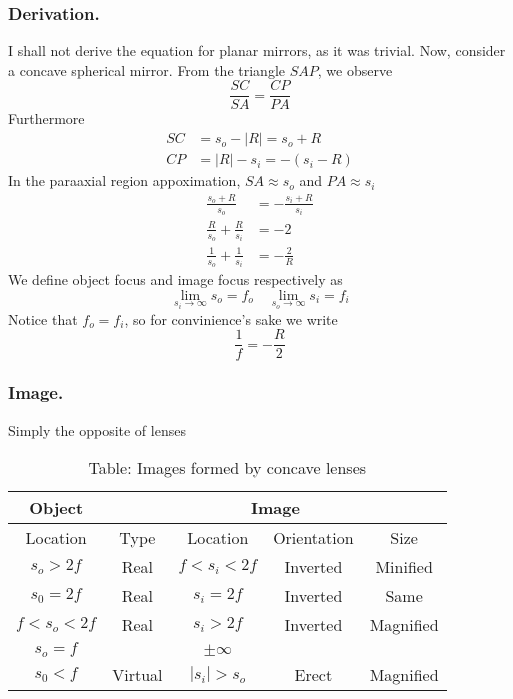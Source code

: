 \documentclass[../../../main.tex]{subfiles}
\begin{document}
\subsubsection{Derivation.}
I shall not derive the equation for planar mirrors, as it was trivial. Now, consider a concave spherical mirror. From the triangle $SAP$, we observe 
\begin{equation*}
    \frac{SC}{SA}=\frac{CP}{PA}
\end{equation*}
Furthermore
\begin{align*}
    SC&=s_o-|R|=s_o+R\\
    CP&=|R|-s_i=-(s_i-R)
\end{align*}
In the paraaxial region appoximation, $SA\approx s_o$ and $PA\approx s_i$
\begin{align*}
    \frac{s_o+R}{s_o}&=-\frac{s_i+R}{s_i}\\
    \frac{R}{s_o}+\frac{R}{s_i}&=-2\\
    \frac{1}{s_o}+\frac{1}{s_i}&=-\frac{2}{R}
\end{align*}
We define object focus and image focus respectively as 
\begin{equation*}
    \lim_{s_i\rightarrow\infty}s_o=f_o\quad\lim_{s_o\rightarrow\infty}s_i=f_i
\end{equation*}
Notice that $f_o=f_i$, so for convinience's sake we write 
\begin{equation*}
    \frac{1}{f}=-\frac{R}{2}
\end{equation*}

\subsubsection{Image.} Simply the opposite of lenses 
\begin{table}
    \centering
    \caption*{Table: Images formed by concave lenses}
    \begin{tabular}{ccccc}
        \toprule
        Object & \multicolumn{4}{c}{Image}\\
        \midrule
        Location & Type & Location & Orientation & Size\\
        \midrule
        $s_o>2f$ &Real &$f<s_i<2f$ &Inverted &Minified \\
        $s_0=2f$ &Real &$s_i=2f$ &Inverted &Same \\
        $f<s_o<2f$ &Real &$s_i>2f$ &Inverted &Magnified \\
        $s_o=f$ & &$\pm \infty$ & & \\
        $s_0<f$ &Virtual &$|s_i|>s_o$ &Erect &Magnified \\
        \bottomrule
    \end{tabular}
\end{table}
\end{document}
